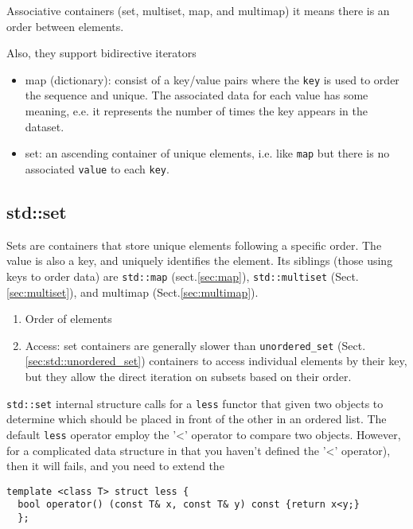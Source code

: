 Associative containers (set, multiset, map, and multimap)
it means there is an order between elements.
 
Also, they support bidirective iterators
  \begin{itemize}

    \item map (dictionary): consist of a key/value pairs where the \verb!key! is
    used to order the sequence and unique. The associated data for each value
    has some meaning, e.e. it represents the number of times the key appears in
    the dataset.

    \item set: an ascending container of unique elements, i.e. like \verb!map!
    but there is no associated \verb!value! to each \verb!key!.
  \end{itemize}

  
\subsection{std::set}
\label{sec:std::set}


Sets are containers that store unique elements following a specific order.
The value is also a key, and uniquely identifies the  element.
Its siblings (those using keys to order data) are \verb!std::map!
(sect.\ref{sec:map}), \verb!std::multiset! (Sect.\ref{sec:multiset}), and 
multimap (Sect.\ref{sec:multimap}).

\begin{enumerate}
  \item Order of elements
  
  
  \item Access: 
set containers are generally slower than \verb!unordered_set!
(Sect.\ref{sec:std::unordered_set}) containers to access individual elements by
their key, but they allow the direct iteration on subsets based on their order.

\end{enumerate}

\verb!std::set! internal structure calls for a \verb!less! functor that given
two  objects to determine which should be placed in front of the other in an ordered list.
The default \verb!less! operator employ the '<' operator to compare two objects.
However, for a complicated data structure in that you haven't defined the '<' operator), then it will fails, and you need to extend the 
\begin{lstlisting}
template <class T> struct less {
  bool operator() (const T& x, const T& y) const {return x<y;}
  };
\end{lstlisting}

